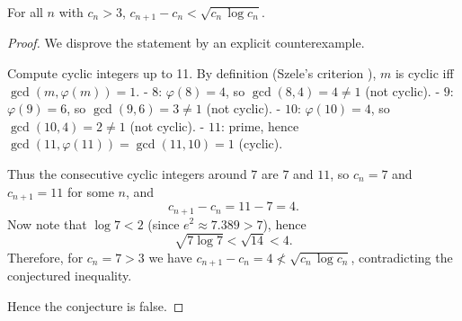 \begin{theorem}\label{thm:carneiro_cyclics}
For all $n$ with $c_n>3$, $c_{n+1}-c_n<\sqrt{c_n\,\log c_n}$.
\end{theorem}

\begin{proof}
We disprove the statement by an explicit counterexample.

Compute cyclic integers up to 11. By definition (Szele's criterion \cite{Szele1947}), $m$ is cyclic iff $\gcd(m,\varphi(m))=1$.
- $8$: $\varphi(8)=4$, so $\gcd(8,4)=4\ne1$ (not cyclic).
- $9$: $\varphi(9)=6$, so $\gcd(9,6)=3\ne1$ (not cyclic).
- $10$: $\varphi(10)=4$, so $\gcd(10,4)=2\ne1$ (not cyclic).
- $11$: prime, hence $\gcd(11,\varphi(11))=\gcd(11,10)=1$ (cyclic).

Thus the consecutive cyclic integers around $7$ are $7$ and $11$, so $c_{n}=7$ and $c_{n+1}=11$ for some $n$, and
$$
 c_{n+1}-c_n=11-7=4.
$$
Now note that $\log 7<2$ (since $e^2\approx7.389>7$), hence
$$
 \sqrt{7\log 7}<\sqrt{14}<4.
$$
Therefore, for $c_n=7>3$ we have $c_{n+1}-c_n=4\not<\sqrt{c_n\,\log c_n}$, contradicting the conjectured inequality.

Hence the conjecture is false. 
\end{proof}

